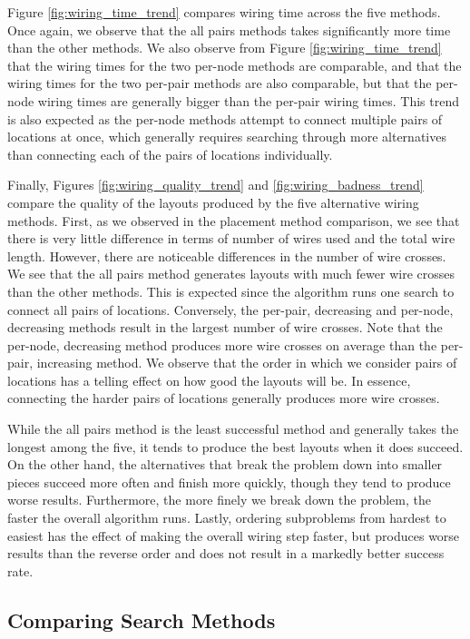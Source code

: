 Figure \ref{fig:wiring_time_trend} compares wiring time across
the five methods. Once again, we observe that the all pairs methods takes
significantly more time than the other methods. We also observe from Figure
\ref{fig:wiring_time_trend} that the wiring times for the two per-node methods
are comparable, and that the wiring times for the two per-pair methods are also
comparable, but that the per-node wiring times are generally bigger than the
per-pair wiring times. This trend is also expected as the per-node methods
attempt to connect multiple pairs of locations at once, which generally requires
searching through more alternatives than
connecting each of the pairs of locations individually.

Finally, Figures \ref{fig:wiring_quality_trend} and
\ref{fig:wiring_badness_trend} compare the
quality of the layouts produced by the five alternative wiring methods. First,
as we observed in the placement method comparison, we see that there is very
little difference in terms of number of wires used and the total wire length.
However, there are noticeable differences in the number of wire crosses. We see
that the all pairs method generates layouts with much fewer wire crosses than
the other methods. This is expected since the algorithm runs one search to
connect all pairs of locations. Conversely, the per-pair, decreasing and
per-node, decreasing methods
result in the largest number of wire crosses. Note that
the per-node, decreasing method produces more wire crosses on average than the
per-pair,
increasing method. We observe that the order in which we consider pairs of
locations has a telling effect on how good the layouts will be. In essence,
connecting the harder pairs of locations generally produces more wire crosses.

While the all pairs method is the least successful
method and generally takes the longest among the five,
it tends to produce the best layouts when it does succeed. On the other hand,
the alternatives that break the problem down into smaller pieces succeed more
often and finish more quickly, though they tend to produce worse results.
Furthermore,
the more finely we break down the problem, the faster the overall algorithm runs.
Lastly, ordering subproblems from hardest to easiest has the effect of making the
overall wiring step faster, but produces worse results than the reverse
order and does not result in a markedly better success rate.

\subsection{Comparing Search Methods}

